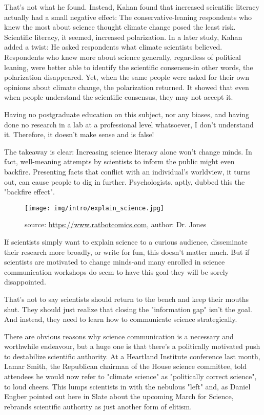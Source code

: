 	That's not what he found. Instead, Kahan found that increased scientific literacy actually had a small negative effect: The conservative-leaning respondents who knew the most about science thought climate change posed the least risk. Scientific literacy, it seemed, increased polarization. In a later study, Kahan added a twist: He asked respondents what climate scientists believed. Respondents who knew more about science generally, regardless of political leaning, were better able to identify the scientific consensus-in other words, the polarization disappeared. Yet, when the same people were asked for their own opinions about climate change, the polarization returned. It showed that even when people understand the scientific consensus, they may not accept it.
	
	\begin{fquote}Having no postgraduate education on this subject, nor any biases, and having done no research in a lab at a professional level whatsoever, I don't understand it. Therefore, it doesn't make sense and is false!
 	\end{fquote}

	The takeaway is clear: Increasing science literacy alone won't change minds. In fact, well-meaning attempts by scientists to inform the public might even backfire. Presenting facts that conflict with an individual's worldview, it turns out, can cause people to dig in further. Psychologists, aptly, dubbed this the "backfire effect".
	\begin{figure}[H]
		\centering
		\texttt{[image: img/intro/explain\_science.jpg]}
		\caption[]{source: \url{https://www.ratbotcomics.com}, author: Dr. Jones}
	\end{figure}
	If scientists simply want to explain science to a curious audience, disseminate their research more broadly, or write for fun, this doesn't matter much. But if scientists are motivated to change minds-and many enrolled in science communication workshops do seem to have this goal-they will be sorely disappointed.

	That's not to say scientists should return to the bench and keep their mouths shut. They should just realize that closing the "information gap" isn't the goal. And instead, they need to learn how to communicate science strategically.

	There are obvious reasons why science communication is a necessary and worthwhile endeavour, but a huge one is that there's a politically motivated push to destabilize scientific authority. At a Heartland Institute conference last month, Lamar Smith, the Republican chairman of the House science committee, told attendees he would now refer to "climate science" as "politically correct science", to loud cheers. This lumps scientists in with the nebulous "left" and, as Daniel Engber pointed out here in Slate about the upcoming March for Science, rebrands scientific authority as just another form of elitism.


